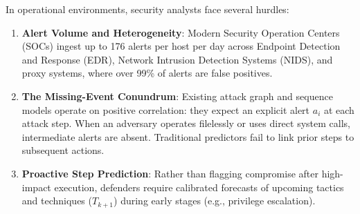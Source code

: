 \documentclass[11pt,a4paper]{article}
\begin{document}
In operational environments, security analysts face several hurdles:
\begin{enumerate}
    \item \textbf{Alert Volume and Heterogeneity}: Modern Security Operation Centers (SOCs) ingest up to 176 alerts per host per day across Endpoint Detection and Response (EDR), Network Intrusion Detection Systems (NIDS), and proxy systems, where over 99\% of alerts are false positives.
    \item \textbf{The Missing-Event Conundrum}: Existing attack graph and sequence models operate on positive correlation: they expect an explicit alert $a_i$ at each attack step. When an adversary operates filelessly or uses direct system calls, intermediate alerts are absent. Traditional predictors fail to link prior steps to subsequent actions.
    \item \textbf{Proactive Step Prediction}: Rather than flagging compromise after high-impact execution, defenders require calibrated forecasts of upcoming tactics and techniques ($T_{k+1}$) during early stages (e.g., privilege escalation).
\end{enumerate}
\end{document}
